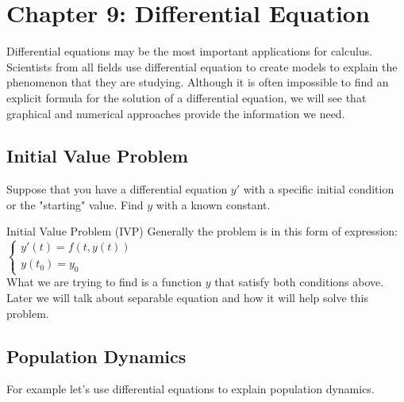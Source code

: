 \documentclass[letterpaper,10pt,twoside,twocolumn,openany]{book}
\begin{document}
\chapter{Chapter 9: Differential Equation}
Differential equations may be the most important applications for calculus. Scientists from all fields use differential equation to create models to explain the phenomenon that they are studying. Although it is often impossible to find an explicit formula for the solution of a differential equation, we will see that graphical and numerical approaches provide the information we need.

\section{Initial Value Problem}
Suppose that you have a differential equation $y'$ with a specific initial condition or the "starting" value. Find $y$ with a known constant.
\begin{paperbox}{Initial Value Problem (IVP)}
    Generally the problem is in this form of expression:
    {\centering
    $\begin{cases}
        y'(t) = f(t,y(t))\\
        y(t_0) = y_0 
    \end{cases}$\\}
    What we are trying to find is a function $y$ that satisfy both conditions above.
    Later we will talk about separable equation and how it will help solve this problem.
\end{paperbox} 


\section{Population Dynamics}
For example let's use differential equations to explain population dynamics.
\end{document}
